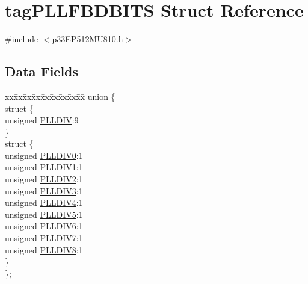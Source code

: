 \hypertarget{structtag_p_l_l_f_b_d_b_i_t_s}{}\section{tag\+P\+L\+L\+F\+B\+D\+B\+I\+TS Struct Reference}
\label{structtag_p_l_l_f_b_d_b_i_t_s}


{\ttfamily \#include $<$p33\+E\+P512\+M\+U810.\+h$>$}

\subsection*{Data Fields}
\begin{DoxyCompactItemize}
\item 
\begin{tabbing}
xx\=xx\=xx\=xx\=xx\=xx\=xx\=xx\=xx\=\kill
union \{\\
\>struct \{\\
\>\>unsigned \hyperlink{structtag_p_l_l_f_b_d_b_i_t_s_adfd20f7afce32e8942e7dc9f73866f08}{PLLDIV}:9\\
\>\} \\
\>struct \{\\
\>\>unsigned \hyperlink{structtag_p_l_l_f_b_d_b_i_t_s_a1f77209a4952210bebdb90dc8dfda956}{PLLDIV0}:1\\
\>\>unsigned \hyperlink{structtag_p_l_l_f_b_d_b_i_t_s_a10e10d3644e12dd5019ad0541aa79ca7}{PLLDIV1}:1\\
\>\>unsigned \hyperlink{structtag_p_l_l_f_b_d_b_i_t_s_a9fcbf641ba9e74b567ce46626593a676}{PLLDIV2}:1\\
\>\>unsigned \hyperlink{structtag_p_l_l_f_b_d_b_i_t_s_af383ea32b8ea2d63b9a81f965d5392b3}{PLLDIV3}:1\\
\>\>unsigned \hyperlink{structtag_p_l_l_f_b_d_b_i_t_s_a460cfb29460dba55f9084653c1242293}{PLLDIV4}:1\\
\>\>unsigned \hyperlink{structtag_p_l_l_f_b_d_b_i_t_s_a777c9f079016c175705397c09c42f52f}{PLLDIV5}:1\\
\>\>unsigned \hyperlink{structtag_p_l_l_f_b_d_b_i_t_s_af2d7b8d7db7c86028721a41475200d23}{PLLDIV6}:1\\
\>\>unsigned \hyperlink{structtag_p_l_l_f_b_d_b_i_t_s_a33a677f5d950e52ab957fe07d95207ea}{PLLDIV7}:1\\
\>\>unsigned \hyperlink{structtag_p_l_l_f_b_d_b_i_t_s_a33daf8ffbd157112afbf1493704cdacc}{PLLDIV8}:1\\
\>\} \\
\}; \\

\end{tabbing}\end{DoxyCompactItemize}



